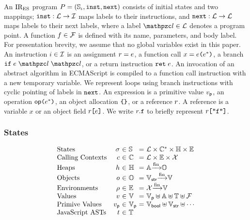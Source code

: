An $\text{IR}_\text{ES}$ program $P = (\mathbb{S}_\iota, \texttt{inst}, \texttt{next})$ consists of initial
states and two mappings; $\texttt{inst}: \mathcal{L} \rightarrow \mathcal{I}$ maps labels to
their instructions, and $\texttt{next}: \mathcal{L} \rightarrow \mathcal{L}$ maps labels to
their next labels, where a label $\lab \in \labset$ denotes a program point.  A
function $f \in \mathcal{F}$ is defined with its name, parameters, and body
label.  For presentation brevity, we assume that no global variables exist in
this paper.  An instruction $i \in \mathcal{I}$ is an assignment $r =
e$, a function call $x = e \texttt{(} e^* \texttt{)}$, a branch $\kwif \;
\expr \; \lab \; \lab$, or a return instruction $\texttt{ret} \; e$.  An
invocation of an abstract algorithm in ECMAScript is compiled to a function call
instruction with a new temporary variable.  We represent loops using branch
instructions with cyclic pointing of labels in $\texttt{next}$.  An expression is a
primitive value $v_{\textsf{p}}$, an operation $\textsf{op} \texttt{(} e^* \texttt{)}$, an object
allocation $\texttt{\{} \texttt{\}}$, or a reference $r$.  A reference is a variable
$x$ or an object field $r \texttt{[} e \texttt{]}$.  We write $r.\texttt{f}$ to
briefly represent $r \texttt{[} \texttt{"f"} \texttt{]}$.


\subsubsection{States}

\[
  \begin{array}{lr@{~}c@{~}l@{~}c@{~}l}
    \text{States} & \st &\in& \stset &=&
    \labset \times \ctxtset^* \times \heapset \times \envset\\

    \text{Calling Contexts} & \ctxt &\in& \ctxtset &=&
    \labset \times \envset \times \varset\\

    \text{Heaps} & \heap &\in& \heapset &=&
    \addrset \finmap \objset\\

    \text{Objects} & \obj &\in& \objset &=&
    \strset \finmap \valset\\

    \text{Environments} & \env &\in& \envset &=&
    \varset \finmap \valset\\

    \text{Values} & \val &\in& \valset &=&
    \pvalset \uplus \addrset \uplus \treeset \uplus \funcset\\

    \text{Primive Values} & \pval &\in& \pvalset &=&
    \boolset \uplus \strset \uplus \cdots\\

    \text{JavaScript ASTs} & \tree &\in& \treeset\\
  \end{array}
\]

